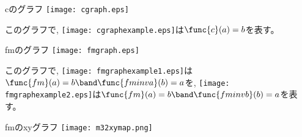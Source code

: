 \documentclass{mystyle}
\begin{document}
%
\begin{section}{cのグラフ}
\texttt{[image: cgraph.eps]}\par\nobreak
このグラフで, \texttt{[image: cgraphexample.eps]}は$\func{c}(a)=b$を表す。
\end{section}
%
\begin{section}{fmのグラフ}
\texttt{[image: fmgraph.eps]}\par\nobreak
このグラフで, \texttt{[image: fmgraphexample1.eps]}は$\func{fm}(a)=b\band\func{fminva}(b)=a$を, \texttt{[image: fmgraphexample2.eps]}は$\func{fm}(a)=b\band\func{fminvb}(b)=a$を表す。
\end{section}
%
\begin{section}{fmのxyグラフ}
\texttt{[image: m32xymap.png]}
\end{section}
%
\end{document}

